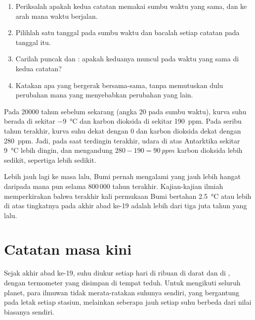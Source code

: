 \begin{method}
\begin{enumerate}
  \item Periksalah apakah kedua catatan memakai sumbu waktu yang sama, dan
        ke arah mana waktu berjalan.
  \item Pilihlah satu tanggal pada sumbu waktu dan bacalah setiap catatan
        pada tanggal itu.
  \item Carilah puncak dan : apakah keduanya muncul pada waktu
        yang sama di kedua catatan?
  \item Katakan apa yang bergerak bersama-sama, tanpa memutuskan dulu
        perubahan mana yang menyebabkan perubahan yang lain.
\end{enumerate}
\end{method}

\begin{example}
Pada \num{20000} tahun sebelum sekarang (angka 20 pada sumbu waktu),
kurva suhu berada di sekitar \qty{-9}{\degreeCelsius} dan karbon dioksida
di sekitar \qty{190}{ppm}. Pada seribu tahun terakhir, kurva suhu dekat
dengan 0 dan karbon dioksida dekat dengan \qty{280}{ppm}. Jadi, pada saat
terdingin  terakhir, udara di atas Antarktika sekitar
\qty{9}{\degreeCelsius} lebih dingin, dan mengandung
$280 - 190 = \qty{90}{ppm}$ karbon dioksida lebih sedikit, sepertiga
lebih sedikit.
\end{example}

Lebih jauh lagi ke masa lalu, Bumi pernah mengalami  yang jauh lebih
hangat daripada  mana pun selama 800\,000 tahun terakhir. Kajian-kajian
ilmiah memperkirakan bahwa terakhir kali permukaan Bumi bertahan
\qty{2.5}{\degreeCelsius} atau lebih di atas tingkatnya pada akhir abad
ke-19 adalah lebih dari tiga juta tahun yang lalu.

\section{Catatan masa kini}

Sejak akhir abad ke-19, suhu diukur setiap hari di ribuan 
di darat dan di , dengan termometer yang disimpan di tempat teduh.
Untuk mengikuti seluruh planet, para ilmuwan tidak merata-ratakan suhunya
sendiri, yang bergantung pada letak setiap stasiun, melainkan seberapa
jauh setiap suhu berbeda dari nilai biasanya sendiri.

